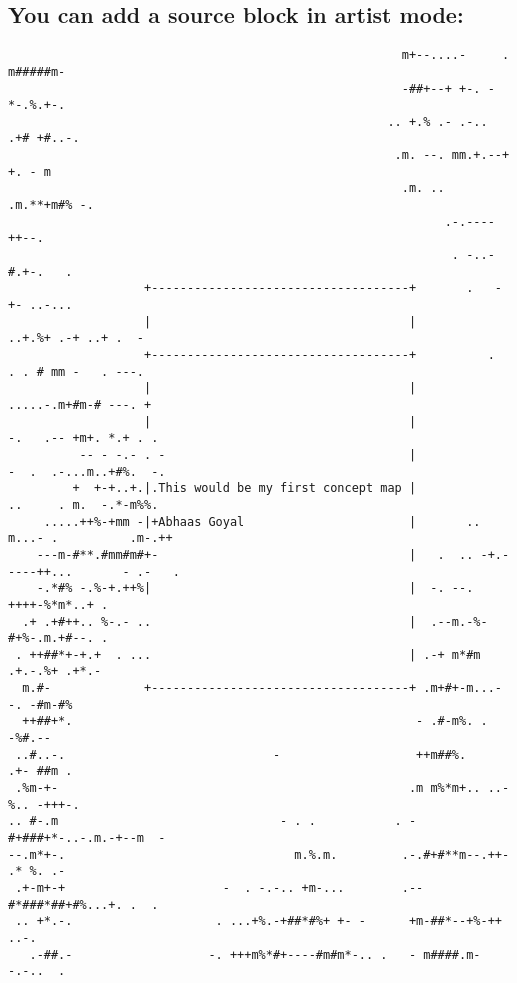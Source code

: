 \documentclass[11pt]{article}
\begin{document}
\subsection{You can add a source block in artist mode:}
\label{sec:org01f6f7b}

\begin{verbatim}
                                                       m+--....-     .  m#####m-
                                                       -##+--+ +-. -    *-.%.+-.
                                                     .. +.% .- .-..  .+# +#..-.
                                                      .m. --. mm.+.--+ +. - m
                                                       .m. .. .m.**+m#% -.
                                                             .-.----++--.
                                                              . -..-#.+-.   .
                   +------------------------------------+       .   -+- ..-...
                   |                                    |            ..+.%+ .-+ ..+ .  -
                   +------------------------------------+          .   . . # mm -   . ---.
                   |                                    |             .....-.m+#m-# ---. +
                   |                                    |               -.   .-- +m+. *.+ . .
          -- - -.- . -                                  |                -  .  .-...m..+#%.  -.
         +  +-+..+.|.This would be my first concept map |               ..     . m.  -.*-m%%.
     .....++%-+mm -|+Abhaas Goyal                       |       ..    m...- .          .m-.++
    ---m-#**.#mm#m#+-                                   |   .  .. -+.-----++...       - .-   .
    -.*#% -.%-+.++%|                                    |  -. --. ++++-%*m*..+ .
  .+ .+#++.. %-.- ..                                    |  .--m.-%-#+%-.m.+#--. .
 . ++##*+-+.+  . ...                                    | .-+ m*#m .+.-.%+ .+*.-
  m.#-             +------------------------------------+ .m+#+-m...- -. -#m-#%
  ++##+*.                                                - .#-m%. .        -%#.--
 ..#..-.                             -                   ++m##%.        .+- ##m .
 .%m-+-                                                 .m m%*m+.. ..-%.. -+++-.
.. #-.m                               - . .           . -#+###+*-..-.m.-+--m  -
--.m*+-.                                m.%.m.         .-.#+#**m--.++- .* %. .-
 .+-m+-+                      -  . -.-.. +m-...        .--#*###*##+#%...+. .  .
 .. +*.-.                    . ...+%.-+##*#%+ +- -      +m-##*--+%-++ ..-.
   .-##.-                   -. +++m%*#+----#m#m*-.. .   - m####.m--.-..  .

\end{verbatim}
\end{document}
